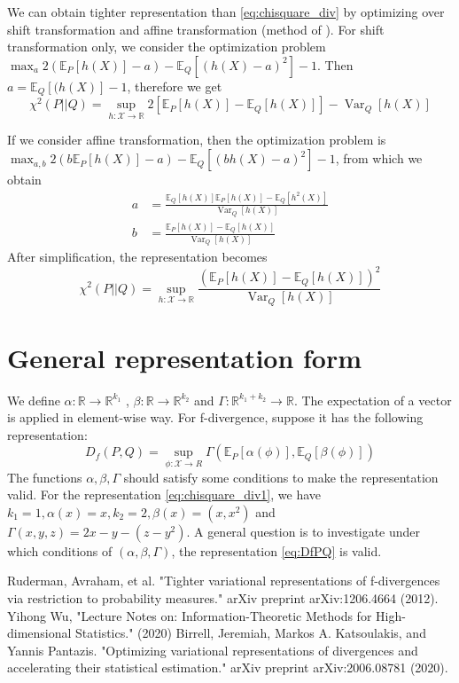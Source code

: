 \documentclass{article}
\DeclareMathOperator\Var{\mathrm{Var}}
\theoremstyle{definition}
\begin{document}
We can obtain tighter representation than
\eqref{eq:chisquare_div} by optimizing over shift transformation and affine transformation (method of \cite{trans}).
For shift transformation only, we consider the optimization problem
$\max_a  2(\mathbb{E}_P[h(X)] - a)
-\mathbb{E}_Q[(h(X) - a)^2] -1$. Then $a=\mathbb{E}_Q[(h(X)]-1$, therefore
we get
\begin{equation}\label{eq:chisquare_div1}
\chi^2(P||Q) = \sup_{h: \mathcal{X} \to \mathbb{R}} 2[\mathbb{E}_P[h(X)]
- \mathbb{E}_Q[h(X)]]
-\Var_Q[h(X)]
\end{equation}

If we consider affine transformation, then the optimization problem is
$\max_{a,b}  2(b\mathbb{E}_P[h(X)] - a)
-\mathbb{E}_Q[(bh(X) - a)^2] -1$, from which we obtain
\begin{align*}
a & = \frac{\mathbb{E}_Q[h(X)]\mathbb{E}_P[h(X)] - \mathbb{E}_Q[h^2(X)]}{\Var_Q[h(X)]}  \\
b & = \frac{\mathbb{E}_P[h(X)] - \mathbb{E}_Q[h(X)]}{\Var_Q[h(X)]} 
\end{align*}
After simplification, the representation becomes
\begin{equation}\label{eq:chisquare_div2}
\chi^2(P||Q) = \sup_{h: \mathcal{X} \to \mathbb{R}}
\frac{(\mathbb{E}_P[h(X)] - \mathbb{E}_Q[h(X)])^2}{\Var_Q[h(X)]}
\end{equation}
\section{General representation form}
We define $\alpha: \mathbb{R}\to \mathbb{R}^{k_1}$
, $\beta: \mathbb{R}\to \mathbb{R}^{k_2}$ and $\Gamma: \mathbb{R}^{k_1 + k_2} \to \mathbb{R}$.
The expectation of a vector is applied in element-wise way.
For f-divergence, suppose it has the following representation:
\begin{equation}\label{eq:DfPQ}
D_f(P, Q) = \sup_{\phi: \mathcal{X}\to R} \Gamma(\mathbb{E}_P[\alpha(\phi)], \mathbb{E}_Q[\beta(\phi)])
\end{equation}
The functions $\alpha,\beta, \Gamma$ should
satisfy some conditions to make the representation valid.
For the representation \eqref{eq:chisquare_div1},
we have $k_1=1, \alpha(x) = x, k_2=2,\beta(x) = (x, x^2)$
and $\Gamma(x,y,z)=2x-y-(z-y^2)$. A general question is to investigate
under which conditions of $(\alpha,\beta, \Gamma)$, the representation \eqref{eq:DfPQ}
is valid.
\begin{thebibliography}{9}
	 Ruderman, Avraham, et al. "Tighter variational representations of f-divergences via restriction to probability measures." arXiv preprint arXiv:1206.4664 (2012).
	 Yihong Wu, "Lecture Notes on: Information-Theoretic Methods
	for High-dimensional Statistics." (2020)
	 Birrell, Jeremiah, Markos A. Katsoulakis, and Yannis Pantazis. "Optimizing variational representations of divergences and accelerating their statistical estimation." arXiv preprint arXiv:2006.08781 (2020).
\end{thebibliography}
\end{document}
